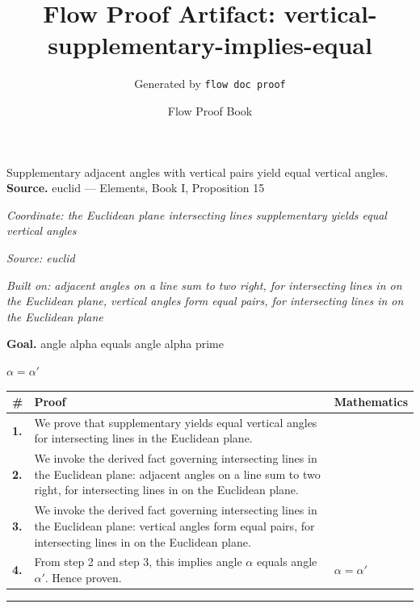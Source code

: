\documentclass[11pt]{article}
\title{Flow Proof Artifact: vertical-supplementary-implies-equal}
\author{Generated by \texttt{flow doc proof}}
\date{Flow Proof Book}
\theoremstyle{definition}
\begin{document}
\maketitle
Supplementary adjacent angles with vertical pairs yield equal vertical angles.\\[0.5em]
\textbf{Source.} euclid — Elements, Book I, Proposition 15\\[0.5em]
\bigskip
{}\par
\smallskip\noindent\textit{Coordinate: the Euclidean plane \cdot intersecting lines \cdot supplementary yields equal vertical angles}\par
\smallskip\noindent\textit{Source: euclid}\par
\smallskip\noindent\textit{Built on: adjacent angles on a line sum to two right, for intersecting lines in on the Euclidean plane, vertical angles form equal pairs, for intersecting lines in on the Euclidean plane}\par
\medskip
\noindent\textbf{Goal.} angle alpha equals angle alpha prime\par
\noindent$\displaystyle \alpha = \alpha'$\par
\medskip
\noindent
\begin{tabular}{@{} >{\raggedright\arraybackslash}p{} >{\raggedright\arraybackslash}p{} >{\raggedleft\arraybackslash}p{} @{}}
\textbf{\#} & \textbf{Proof} & \textbf{Mathematics} \\
\midrule
\textbf{1.} & We prove that supplementary yields equal vertical angles for intersecting lines in the Euclidean plane. & \\[0.45em]
\textbf{2.} & We invoke the derived fact governing intersecting lines in the Euclidean plane: adjacent angles on a line sum to two right, for intersecting lines in on the Euclidean plane. & \\[0.45em]
\textbf{3.} & We invoke the derived fact governing intersecting lines in the Euclidean plane: vertical angles form equal pairs, for intersecting lines in on the Euclidean plane. & \\[0.45em]
\textbf{4.} & From step 2 and step 3, this implies angle $\alpha$ equals angle $\alpha$$'$. Hence proven. & $\displaystyle \alpha = \alpha'$ \\[0.45em]
\bottomrule
\end{tabular}
\label{thm:Geometry-intersecting lines-supplementary_yields_equal_vertical_angles}
\par\medskip\hrule
\end{document}
